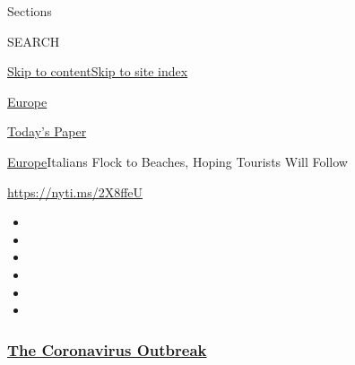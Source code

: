 Sections

SEARCH

\protect\hyperlink{site-content}{Skip to
content}\protect\hyperlink{site-index}{Skip to site index}

\href{https://www.nytimes3xbfgragh.onion/section/world/europe}{Europe}

\href{https://myaccount.nytimes3xbfgragh.onion/auth/login?response_type=cookie\&client_id=vi}{}

\href{https://www.nytimes3xbfgragh.onion/section/todayspaper}{Today's
Paper}

\href{/section/world/europe}{Europe}\textbar{}Italians Flock to Beaches,
Hoping Tourists Will Follow

\url{https://nyti.ms/2X8ffeU}

\begin{itemize}
\item
\item
\item
\item
\item
\item
\end{itemize}

\hypertarget{the-coronavirus-outbreak}{%
\subsubsection{\texorpdfstring{\href{https://www.nytimes3xbfgragh.onion/news-event/coronavirus?name=styln-coronavirus-national\&region=TOP_BANNER\&variant=undefined\&block=storyline_menu_recirc\&action=click\&pgtype=Article\&impression_id=7a3af3d0-e389-11ea-8c9e-c99209fb63ac}{The
Coronavirus
Outbreak}}{The Coronavirus Outbreak}}\label{the-coronavirus-outbreak}}

